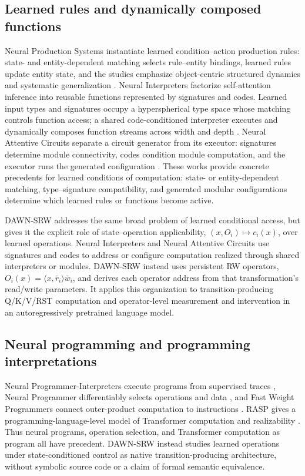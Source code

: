\documentclass{article}
\newcommand{\DAWN}{DAWN-SRW}
\begin{document}
\subsection{Learned rules and dynamically composed functions}

Neural Production Systems instantiate learned condition--action production
rules: state- and entity-dependent matching selects rule--entity bindings,
learned rules update entity state, and the studies emphasize object-centric
structured dynamics and systematic generalization \cite{didolkar2021neural}.
Neural Interpreters factorize self-attention inference into reusable functions
represented by signatures and codes. Learned input types and signatures occupy
a hyperspherical type space whose matching controls function access; a shared
code-conditioned interpreter executes and dynamically composes function
streams across width and depth \cite{rahaman2021dynamic}. Neural Attentive
Circuits separate a circuit generator from its executor: signatures determine
module connectivity, codes condition module computation, and the executor runs
the generated configuration \cite{weiss2022neural}. These works provide concrete
precedents for learned conditions of computation: state- or entity-dependent
matching, type--signature compatibility, and generated modular configurations
determine which learned rules or functions become active.

\DAWN{} addresses the same broad problem of learned conditional access, but
gives it the explicit role of state--operation applicability,
\((x,O_i)\mapsto c_i(x)\), over learned operations.
Neural Interpreters and Neural Attentive Circuits use signatures and codes to
address or configure computation realized through shared interpreters or
modules. \DAWN{} instead uses persistent RW operators,
\(O_i(x)=\langle x,\bar r_i\rangle \bar w_i\), and derives each operator address from
that transformation's read/write parameters. It
applies this organization to transition-producing Q/K/V/RST computation and
operator-level measurement and intervention in an autoregressively pretrained
language model.

\subsection{Neural programming and programming interpretations}

Neural Programmer-Interpreters execute programs from supervised traces
\cite{reed2016npi}, Neural Programmer differentiably selects operations and data
\cite{neelakantan2016neuralprogrammer}, and Fast Weight Programmers connect
outer-product computation to instructions \cite{schlag2021linear}. RASP gives a
programming-language-level model of Transformer computation and realizability
\cite{weiss2021thinking}. Thus neural programs, operation selection, and
Transformer computation as program all have precedent. \DAWN{} instead studies
learned operations under state-conditioned control as native
transition-producing architecture, without symbolic source code or a
claim of formal semantic equivalence.
\end{document}
